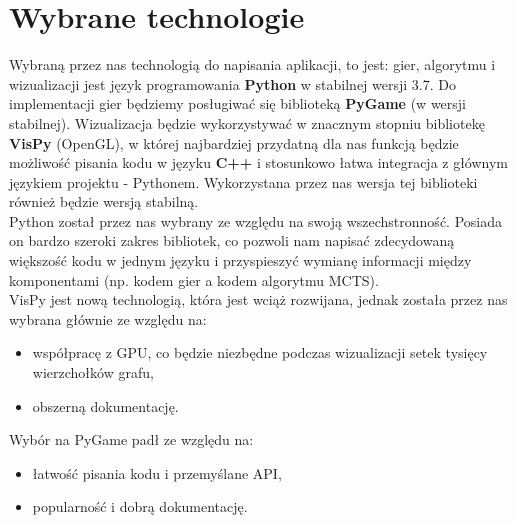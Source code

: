 \documentclass{article}
\let\oldsection\section
\renewcommand\section{\clearpage\oldsection}
\begin{document}
	
	\section{Wybrane technologie}
	Wybraną przez nas technologią do napisania aplikacji, to jest: gier, algorytmu i wizualizacji jest język programowania \textbf{Python} w stabilnej wersji 3.7. Do implementacji gier będziemy posługiwać się biblioteką \textbf{PyGame} (w wersji stabilnej). Wizualizacja będzie wykorzystywać w znacznym stopniu bibliotekę \textbf{VisPy} (OpenGL), w której najbardziej przydatną dla nas funkcją będzie możliwość pisania kodu w języku \textbf{C++} i stosunkowo łatwa integracja z głównym językiem projektu - Pythonem. Wykorzystana przez nas wersja tej biblioteki również będzie wersją stabilną.\\
	
	\noindent Python został przez nas wybrany ze względu na swoją wszechstronność. Posiada on bardzo szeroki zakres bibliotek, co pozwoli nam napisać zdecydowaną większość kodu w jednym języku i przyspieszyć wymianę informacji między komponentami (np. kodem gier a kodem algorytmu MCTS).\\
	
	\noindent VisPy jest nową technologią, która jest wciąż rozwijana, jednak została przez nas wybrana głównie ze względu na:
	\begin{itemize}
		\item współpracę z GPU, co będzie niezbędne podczas wizualizacji setek tysięcy wierzchołków grafu,
		\item obszerną dokumentację.\\
	\end{itemize}

	\noindent Wybór na PyGame padł ze względu na:
	\begin{itemize}
		\item łatwość pisania kodu i przemyślane API,
		\item popularność i dobrą dokumentację.\\
	\end{itemize}	
\end{document}
